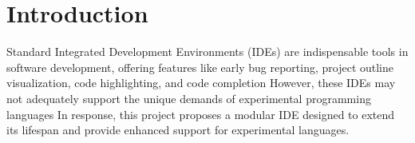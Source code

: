 
\section{Introduction}

Standard Integrated Development Environments (IDEs) are indispensable tools in software development,
offering features like early bug reporting, project outline visualization, code highlighting, and code completion
However, these IDEs may not adequately support the unique demands of experimental programming languages
In response, this project proposes a modular IDE designed to extend its lifespan and provide enhanced support
for experimental languages.
